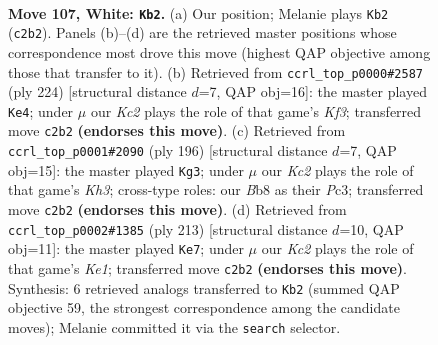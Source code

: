 \documentclass[11pt]{article}
\begin{document}
\clearpage

\begin{figure}[p]\centering
\begin{subfigure}{0.46\textwidth}\centering
\resizebox{\linewidth}{!}{%
\newchessgame
\chessboard[
  setfen={1B4k1/8/8/5R1P/8/4rp2/2K5/8 w - - 6 107},
  showmover=false,
  pgfstyle=straightmove, color=movearrow, markmove={c2-b2}
]}
\caption{}
\end{subfigure}\hfill
\begin{subfigure}{0.46\textwidth}\centering
\resizebox{\linewidth}{!}{%
\newchessgame
\chessboard[
  setfen={8/6k1/3PR2p/7r/8/5K2/8/8 w - - 1 113},
  showmover=false,
  pgfstyle=straightmove, color=movearrow, markmove={f3-e4}
]}
\caption{}
\end{subfigure}
\\[4pt]
\begin{subfigure}{0.46\textwidth}\centering
\resizebox{\linewidth}{!}{%
\newchessgame
\chessboard[
  setfen={1r6/8/6k1/1p2R3/8/2P2P1K/8/8 w - - 3 99},
  showmover=false,
  pgfstyle=straightmove, color=movearrow, markmove={h3-g3}
]}
\caption{}
\end{subfigure}\hfill
\begin{subfigure}{0.46\textwidth}\centering
\resizebox{\linewidth}{!}{%
\newchessgame
\chessboard[
  setfen={4k3/5p2/1P6/2K5/8/3R4/1r6/8 b - - 2 107},
  showmover=false,
  pgfstyle=straightmove, color=movearrow, markmove={e8-e7}
]}
\caption{}
\end{subfigure}
\caption{\textbf{Move 107, White: \texttt{Kb2}.} (a) Our position; Melanie plays \texttt{Kb2} (\texttt{c2b2}). Panels (b)--(d) are the retrieved master positions whose correspondence most drove this move (highest QAP objective among those that transfer to it). (b) Retrieved from \texttt{ccrl\_top\_p0000\#2587} (ply 224) [structural distance $d$=7, QAP obj=16]: the master played \texttt{Ke4}; under $\mu$ our \emph{Kc2} plays the role of that game's \emph{Kf3}; transferred move \texttt{c2b2} \textbf{(endorses this move)}. (c) Retrieved from \texttt{ccrl\_top\_p0001\#2090} (ply 196) [structural distance $d$=7, QAP obj=15]: the master played \texttt{Kg3}; under $\mu$ our \emph{Kc2} plays the role of that game's \emph{Kh3}; cross-type roles: our \emph{B}b8 as their \emph{P}c3; transferred move \texttt{c2b2} \textbf{(endorses this move)}. (d) Retrieved from \texttt{ccrl\_top\_p0002\#1385} (ply 213) [structural distance $d$=10, QAP obj=11]: the master played \texttt{Ke7}; under $\mu$ our \emph{Kc2} plays the role of that game's \emph{Ke1}; transferred move \texttt{c2b2} \textbf{(endorses this move)}. Synthesis: 6 retrieved analogs transferred to \texttt{Kb2} (summed QAP objective 59, the strongest correspondence among the candidate moves); Melanie committed it via the \texttt{search} selector.}
\label{fig:thought-m212}
\end{figure}
\end{document}

